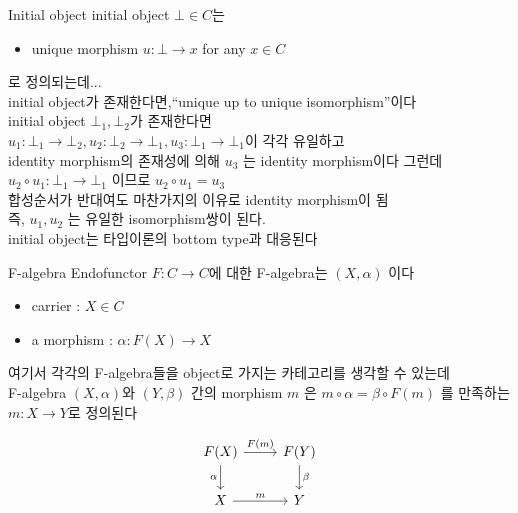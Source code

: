 \documentclass[t]{beamer}
\begin{document}
\begin{frame}{Initial object}
  initial object \( \bot \in C \)는
  \begin{itemize}
    \item unique morphism \(u : \bot \to x \) for any \(x \in C\)
  \end{itemize}
  로 정의되는데...\\
  \pause
  initial object가 존재한다면,``unique up to unique isomorphism''이다\newline \\
  initial object \(\bot_1, \bot_2\)가 존재한다면\\
  \( u_1 : \bot_1 \to \bot_2, u_2 : \bot_2 \to \bot_1, u_3 : \bot_1 \to \bot_1 \)이 각각 유일하고\\
  identity morphism의 존재성에 의해 \( u_3 \) 는 identity morphism이다
  그런데 \( u_2 \circ u_1 : \bot_1 \to \bot_1 \) 이므로 \( u_2 \circ u_1 = u_3 \)\\
  합성순서가 반대여도 마찬가지의 이유로 identity morphism이 됨\\
  즉, \( u_1, u_2 \) 는 유일한 isomorphism쌍이 된다.\newline\\
  \pause
  initial object는 타입이론의 bottom type과 대응된다
\end{frame}

\begin{frame}[fragile]{F-algebra}
  Endofunctor \(F : C \to C\)에 대한 F-algebra는 \((X, \alpha)\) 이다
  \begin{itemize}
    \item carrier : \( X \in C\)
    \item a morphism : \( \alpha : F(X) \to X \)
  \end{itemize}

  \pause
  여기서 각각의 F-algebra들을 object로 가지는 카테고리를 생각할 수 있는데\\
  F-algebra \((X, \alpha)\)와 \((Y, \beta)\) 간의 morphism \(m\) 은
  \( m \circ \alpha = \beta \circ F(m) \) 를 만족하는 \( m : X \to Y \)로 정의된다

  \[
    \begin{tikzcd}
      F(X) \arrow{r}{F(m)} \arrow[swap]{d}{\alpha} & F(Y) \arrow{d}{\beta} \\%
      X \arrow{r}{m} & Y
    \end{tikzcd}
  \]
\end{frame}
\end{document}
